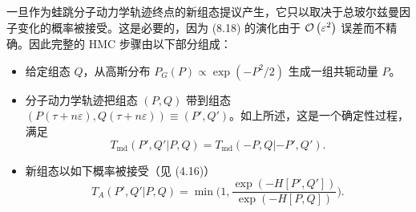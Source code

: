 一旦作为蛙跳分子动力学轨迹终点的新组态提议产生，它只以取决于总玻尔兹曼因子变化的概率被接受。这是必要的，因为 (8.18) 的演化由于 $\mathcal{O}\left(\varepsilon^2\right)$ 误差而不精确。因此完整的 HMC 步骤由以下部分组成：
\begin{itemize}
  \item 给定组态 $Q$，从高斯分布 $P_G(P) \propto \exp(-P^2/2)$ 生成一组共轭动量 $P$。
  \item 分子动力学轨迹把组态 $(P,Q)$ 带到组态 $(P(\tau + n\varepsilon), Q(\tau + n\varepsilon))
        \equiv (P',Q')$。如上所述，这是一个确定性过程，满足
        \begin{equation}
        T_{\mathrm{md}}(P',Q'|P,Q) = T_{\mathrm{md}}(-P,Q|-P',Q').
        \end{equation}
  \item 新组态以如下概率被接受（见 (4.16)）
        \begin{equation}
        T_A(P',Q'|P,Q) = \min\!\Big(1, \frac{\exp(-H[P',Q'])}{\exp(-H[P,Q])}\Big).
        \end{equation}
\end{itemize}

